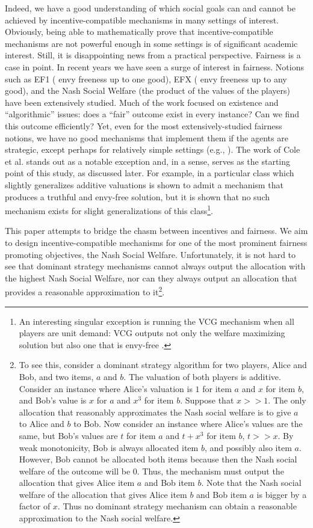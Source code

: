 \documentclass{theoretics}
\begin{document}
Indeed, we have a good understanding of which social goals can and cannot be achieved by incentive-compatible mechanisms in many settings of interest. Obviously, being able to mathematically prove that incentive-compatible mechanisms are not powerful enough in some settings is of significant academic interest. Still, it is disappointing news from a practical perspective. Fairness is a case in point. In recent years we have seen a surge of interest in fairness. Notions such as EF1 (\cite{budish2011combinatorial} envy freeness up to one good), EFX (\cite{CKMPSW19} envy freeness up to any good), and the Nash Social Welfare (the product of the values of the players) have been extensively studied. Much of the work focused on existence and ``algorithmic'' issues: does a ``fair'' outcome exist in every instance? Can we find this outcome efficiently? Yet, even for the most extensively-studied fairness notions, we have no good mechanisms that implement them if the agents are strategic, except perhaps for relatively simple settings (e.g., \cite{BEF21,CFFKO11} ). {The work of Cole et al. \cite{CGG13} stands out as a notable exception and, in a sense, serves as the starting point of this study, as discussed later.} For example, in \cite{CFFKO11} a particular class which slightly generalizes additive valuations is shown to admit a mechanism that produces a truthful and envy-free solution, but it is shown that no such mechanism exists for slight generalizations of this class\footnote{An interesting singular exception is running the VCG mechanism when all players are unit demand: VCG outputs not only the welfare maximizing solution but also one that is envy-free \cite{L83}.}.

This paper attempts to bridge the chasm between incentives and fairness. We aim to design incentive-compatible mechanisms for one of the most prominent fairness promoting objectives, the Nash Social Welfare. Unfortunately, it is not hard to see that dominant strategy mechanisms cannot always output the allocation with the highest Nash Social Welfare, nor can they always output an allocation that provides a reasonable approximation to it\footnote{To see this, consider a dominant strategy algorithm for two players, Alice and Bob, and two items, $a$ and $b$. The valuation of both players is additive. Consider an instance where Alice's valuation is $1$ for item $a$ and $x$ for item $b$, and Bob's value is $x$ for $a$ and $x^3$ for item $b$. Suppose that $x>>1$. The only allocation that reasonably approximates the Nash social welfare is to give $a$ to Alice and $b$ to Bob. Now consider an instance where Alice's values are the same, but Bob's values are $t$ for item $a$ and $t+x^3$ for item $b$, $t>>x$. By weak monotonicity, Bob is always allocated item $b$, and possibly also item $a$. However, Bob cannot be allocated both items because then the Nash social welfare of the outcome will be $0$. Thus, the mechanism must output the allocation that gives Alice item $a$ and Bob item $b$. Note that the Nash social welfare of the allocation that gives Alice item $b$ and Bob item $a$ is bigger by a factor of $x$. Thus no dominant strategy mechanism can obtain a reasonable approximation to the Nash social welfare.}. 
\end{document}
